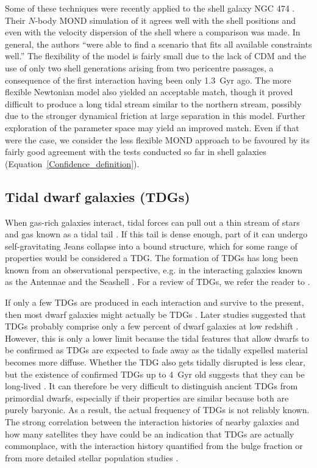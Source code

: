 \documentclass[fleqn,usenatbib,useAMS]{mnras} %
\begin{document}
Some of these techniques were recently applied to the shell galaxy NGC 474 \citep{Bilek_2022}. Their $N$-body MOND simulation of it agrees well with the shell positions and even with the velocity dispersion of the shell where a comparison was made. In general, the authors ``were able to find a scenario that fits all
available constraints well.'' The flexibility of the model is fairly small due to the lack of CDM and the use of only two shell generations arising from two pericentre passages, a consequence of the first interaction having been only 1.3~Gyr ago. The more flexible Newtonian model also yielded an acceptable match, though it proved difficult to produce a long tidal stream similar to the northern stream, possibly due to the stronger dynamical friction at large separation in this model. Further exploration of the parameter space may yield an improved match. Even if that were the case, we consider the less flexible MOND approach to be favoured by its fairly good agreement with the tests conducted so far in shell galaxies (Equation~\ref{Confidence_definition}).



\subsection{Tidal dwarf galaxies (TDGs)}
\label{Tidal_dwarf_galaxies}

When gas-rich galaxies interact, tidal forces can pull out a thin stream of stars and gas known as a tidal tail \citep{Toomre_1972}. If this tail is dense enough, part of it can undergo self-gravitating Jeans collapse into a bound structure, which for some range of properties would be considered a TDG. The formation of TDGs has long been known from an observational perspective, e.g. in the interacting galaxies known as the Antennae \citep{Mirabel_1992} and the Seashell \citep{Bournaud_2004}. For a review of TDGs, we refer the reader to \citet{Lelli_2015}.

If only a few TDGs are produced in each interaction and survive to the present, then most dwarf galaxies might actually be TDGs \citep{Okazaki_2000}. Later studies suggested that TDGs probably comprise only a few percent of dwarf galaxies at low redshift \citep{Kaviraj_2012}. However, this is only a lower limit because the tidal features that allow dwarfs to be confirmed as TDGs are expected to fade away as the tidally expelled material becomes more diffuse. Whether the TDG also gets tidally disrupted is less clear, but the existence of confirmed TDGs up to 4~Gyr old suggests that they can be long-lived \citep{Duc_2014}. It can therefore be very difficult to distinguish ancient TDGs from primordial dwarfs, especially if their properties are similar because both are purely baryonic. As a result, the actual frequency of TDGs is not reliably known. The strong correlation between the interaction histories of nearby galaxies and how many satellites they have could be an indication that TDGs are actually commonplace, with the interaction history quantified from the bulge fraction \citep{Kroupa_2010, Corredoira_2016, Javanmardi_2019} or from more detailed stellar population studies \citep{Smercina_2022}.
\end{document}
